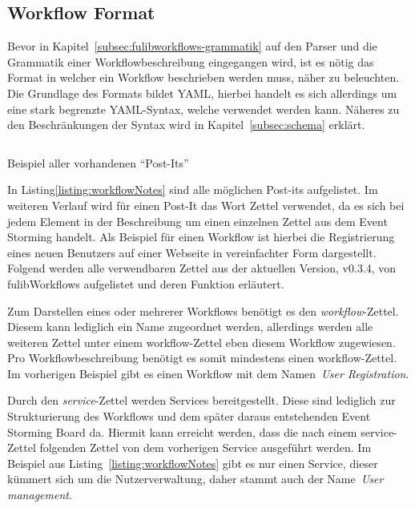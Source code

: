 \subsection{Workflow Format}\label{subsec:workflow-format}
Bevor in Kapitel~\ref{subsec:fulibworkflows-grammatik} auf den Parser und die Grammatik einer Workflowbeschreibung eingegangen wird,
ist es nötig das Format in welcher ein Workflow beschrieben werden muss, näher zu beleuchten.
Die Grundlage des Formats bildet \ac*{YAML}, hierbei handelt es sich allerdings um eine stark begrenzte YAML-Syntax, welche verwendet werden kann.
Näheres zu den Beschränkungen der Syntax wird in Kapitel~\ref{subsec:schema} erklärt.

\begin{listing}[!ht]
    \inputminted{json}{listings/3.1/allNotes.es.yaml}
    \caption{Beispiel aller vorhandenen ``Post-Its''}
    \label{listing:workflowNotes}
\end{listing}

In Listing\ref{listing:workflowNotes} sind alle möglichen Post-its aufgelistet.
Im weiteren Verlauf wird für einen Post-It das Wort Zettel verwendet, da es sich bei jedem Element in der Beschreibung um einen einzelnen Zettel aus dem Event Storming handelt.
Als Beispiel für einen Workflow ist hierbei die Registrierung eines neuen Benutzers auf einer Webseite in vereinfachter Form dargestellt.
Folgend werden alle verwendbaren Zettel aus der aktuellen Version, v0.3.4, von fulibWorkflows aufgelistet und deren Funktion erläutert.


Zum Darstellen eines oder mehrerer Workflows benötigt es den \textit{workflow}-Zettel.
Diesem kann lediglich ein Name zugeordnet werden, allerdings werden alle weiteren Zettel unter einem workflow-Zettel eben diesem Workflow zugewiesen.
Pro Workflowbeschreibung benötigt es somit mindestens einen workflow-Zettel.
Im vorherigen Beispiel gibt es einen Workflow mit dem Namen~\textit{User Registration}.


Durch den \textit{service}-Zettel werden Services bereitgestellt.
Diese sind lediglich zur Strukturierung des Workflows und dem später daraus entstehenden Event Storming Board da.
Hiermit kann erreicht werden, dass die nach einem service-Zettel folgenden Zettel von dem vorherigen Service ausgeführt werden.
Im Beispiel aus Listing~\ref{listing:workflowNotes} gibt es nur einen Service, dieser kümmert sich um die Nutzerverwaltung, daher
stammt auch der Name~\textit{User management}.

